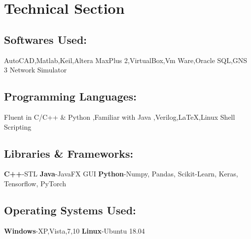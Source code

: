 \documentclass{article}
\begin{document}
\section*{Technical Section}
\subsection*{Softwares Used:}
AutoCAD,Matlab,Keil,Altera MaxPlus 2,VirtualBox,Vm Ware,Oracle SQL,GNS 3 Network Simulator
\subsection*{Programming Languages:}
Fluent in C/C++ \& Python ,Familiar with Java ,Verilog,{\LaTeX},Linux Shell Scripting
\subsection*{Libraries \& Frameworks:}
\textbf{C++}-STL
\textbf{Java}-JavaFX GUI
\textbf{Python}-Numpy, Pandas, Scikit-Learn, Keras, Tensorflow, PyTorch
\subsection*{Operating Systems Used:}
\textbf{Windows}-XP,Vista,7,10
\textbf{Linux}-Ubuntu 18.04
\end{document}
